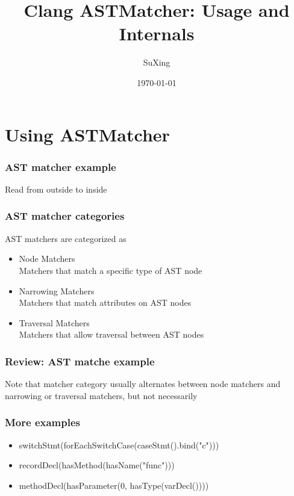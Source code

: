 \documentclass[]{beamer}
\title{Clang ASTMatcher: Usage and Internals}
\author[SuXing~pysuxing@gmail.com]{SuXing}
\institute{TOW}
\date{\today}
\begin{document}
\setlength{\parindent}{0pt}

\frame{\titlepage}

\frame{\tableofcontents}

\section{Using ASTMatcher}
\frame{\tableofcontents[currentsection]}

\begin{frame}
  \frametitle{AST matcher example}
  

  \pause
  Read from \alert{outside to inside}
\end{frame}

\begin{frame}
  \frametitle{AST matcher categories}
  AST matchers are categorized as
  \begin{itemize}
    \item Node Matchers\\
      Matchers that match a specific type of AST node
    \item Narrowing Matchers\\
      Matchers that match attributes on AST nodes
    \item Traversal Matchers\\
      Matchers that allow traversal between AST nodes
  \end{itemize}
\end{frame}

\begin{frame}
  \frametitle{Review: AST matche example}
  

  \pause
  Note that matcher category \alert{usually} alternates between node matchers
  and narrowing or traversal matchers, but \alert{not necessarily}
\end{frame}

\begin{frame}
  \frametitle{More examples}
  \begin{itemize}
    \item<1-> switchStmt(forEachSwitchCase(caseStmt().bind("c")))
    \item<2-> recordDecl(hasMethod(hasName("func")))
    \item<3-> methodDecl(hasParameter(0, hasType(varDecl())))
  \end{itemize}
\end{frame}
\end{document}
